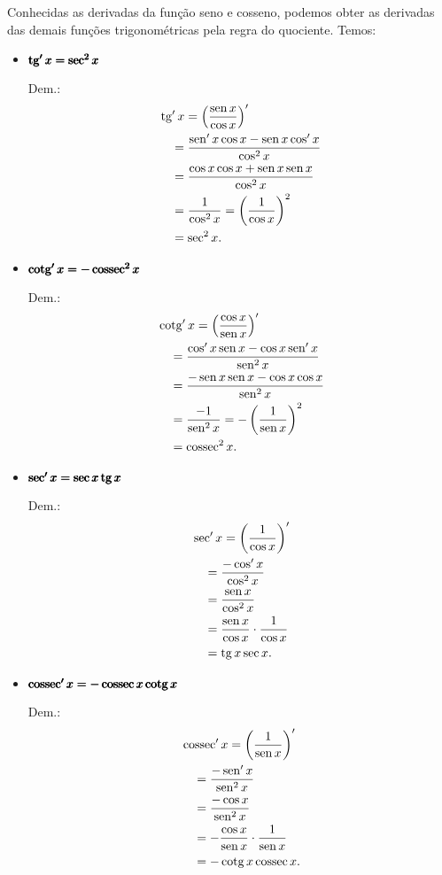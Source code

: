 Conhecidas as derivadas da função seno e cosseno, podemos obter as derivadas das demais funções trigonométricas pela regra do quociente. Temos:
\begin{itemize}
\item $\pmb{\operatorname{tg}' x = \sec^2 x}$

  Dem.:
  \begin{align}
    & \operatorname{tg} ' x = \left(\frac{\operatorname{sen} x}{\cos x}\right)'\\
    & \text{}\quad = \frac{\operatorname{sen}' x\cos x - \operatorname{sen} x\cos' x}{\cos^2 x} \\
    & \text{}\quad = \frac{\cos x\cos x + \operatorname{sen} x\operatorname{sen} x}{\cos^2 x} \\
    & \text{}\quad = \frac{1}{\cos^2 x} = \left(\frac{1}{\cos x}\right)^2 \\
    & \text{}\quad = \sec^2 x.
  \end{align}

\item $\pmb{\operatorname{cotg}' x = -\operatorname{cossec}^2 x}$

  Dem.:
  \begin{align}
    & \operatorname{cotg} ' x = \left(\frac{\cos x}{\operatorname{sen} x}\right)'\\
    & \text{}\quad = \frac{\cos' x\operatorname{sen} x - \cos x\operatorname{sen}' x}{\operatorname{sen}^2 x} \\
    & \text{}\quad = \frac{-\operatorname{sen} x\operatorname{sen} x - \cos x\cos x}{\operatorname{sen}^2 x} \\
    & \text{}\quad = \frac{-1}{\operatorname{sen}^2 x} = -\left(\frac{1}{\operatorname{sen} x}\right)^2 \\
    & \text{}\quad = \operatorname{cossec}^2 x.
  \end{align}

\item $\pmb{\sec' x = \sec x\operatorname{tg} x}$

  Dem.:
  \begin{align}
    & \sec ' x = \left(\frac{1}{\cos x}\right)'\\
    & \text{}\quad = \frac{-\cos' x}{\cos^2 x} \\
    & \text{}\quad = \frac{\operatorname{sen} x}{\cos^2 x} \\
    & \text{}\quad = \frac{\operatorname{sen} x}{\cos x}\cdot \frac{1}{\cos x} \\
    & \text{}\quad = \operatorname{tg} x\sec x.
  \end{align}

\item $\pmb{\operatorname{cossec}' x = -\operatorname{cossec} x\operatorname{cotg} x}$

  Dem.:
  \begin{align}
    & \operatorname{cossec} ' x = \left(\frac{1}{\operatorname{sen} x}\right)'\\
    & \text{}\quad = \frac{-\operatorname{sen}' x}{\operatorname{sen}^2 x} \\
    & \text{}\quad = \frac{-\cos x}{\operatorname{sen}^2 x} \\
    & \text{}\quad = -\frac{\cos x}{\operatorname{sen} x}\cdot \frac{1}{\operatorname{sen} x} \\
    & \text{}\quad = -\operatorname{cotg} x\operatorname{cossec} x.
  \end{align}
\end{itemize}

